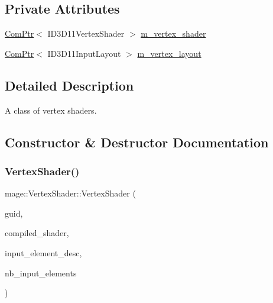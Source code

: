 \subsection*{Private Attributes}
\begin{DoxyCompactItemize}
\item 
\hyperlink{namespacemage_ae74f374780900893caa5555d1031fd79}{Com\+Ptr}$<$ I\+D3\+D11\+Vertex\+Shader $>$ \hyperlink{classmage_1_1_vertex_shader_a0b2b02abae4cb226c115d7f1c5464a54}{m\+\_\+vertex\+\_\+shader}
\item 
\hyperlink{namespacemage_ae74f374780900893caa5555d1031fd79}{Com\+Ptr}$<$ I\+D3\+D11\+Input\+Layout $>$ \hyperlink{classmage_1_1_vertex_shader_a9b9895650b8c7f80af846d75f7d9ddda}{m\+\_\+vertex\+\_\+layout}
\end{DoxyCompactItemize}


\subsection{Detailed Description}
A class of vertex shaders. 

\subsection{Constructor \& Destructor Documentation}
\hypertarget{classmage_1_1_vertex_shader_abd7b008391aecafcab640a0b7c4259d1}{}\label{classmage_1_1_vertex_shader_abd7b008391aecafcab640a0b7c4259d1} 
\subsubsection{\texorpdfstring{Vertex\+Shader()}{VertexShader()}\hspace{0.1cm}{\footnotesize\ttfamily [1/4]}}
{\footnotesize\ttfamily mage\+::\+Vertex\+Shader\+::\+Vertex\+Shader (\begin{DoxyParamCaption}\item[{const wstring \&}]{guid,  }\item[{const \hyperlink{structmage_1_1_compiled_shader}{Compiled\+Shader} $\ast$}]{compiled\+\_\+shader,  }\item[{const D3\+D11\+\_\+\+I\+N\+P\+U\+T\+\_\+\+E\+L\+E\+M\+E\+N\+T\+\_\+\+D\+E\+SC $\ast$}]{input\+\_\+element\+\_\+desc,  }\item[{size\+\_\+t}]{nb\+\_\+input\+\_\+elements }\end{DoxyParamCaption})\hspace{0.3cm}{\ttfamily [explicit]}}

